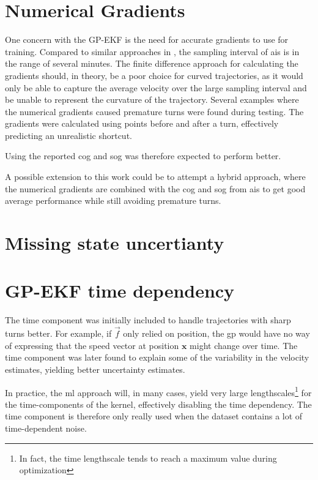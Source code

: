 \section{Numerical Gradients}
One concern with the GP-EKF is the need for accurate gradients to use for training. Compared to similar approaches in \cite{vehicle_gp_prediction,pedestrian}, the sampling interval of \acrshort{ais} is in the range of several minutes. The finite difference approach for calculating the gradients should, in theory, be a poor choice for curved trajectories, as it would only be able to capture the average velocity over the large sampling interval and be unable to represent the curvature of the trajectory. Several examples where the numerical gradients caused premature turns were found during testing. The gradients were calculated using points before and after a turn, effectively predicting an unrealistic shortcut.  

Using the reported \acrshort{cog} and \acrshort{sog} was therefore expected to perform better. 

A possible extension to this work could be to attempt a hybrid approach, where the numerical gradients are combined with the \acrshort{cog} and \acrshort{sog} from \acrshort{ais} to get good average performance while still avoiding premature turns. 

\section{Missing state uncertianty}

\section{GP-EKF time dependency}
The time component was initially included to handle trajectories with sharp turns better. For example, if $\vec{f}$ only relied on position, the \acrshort{gp} would have no way of expressing that the speed vector at position $\boldsymbol{x}$ might change over time. The time component was later found to explain some of the variability in the velocity estimates, yielding better uncertainty estimates.

In practice, the \acrshort{ml} approach will, in many cases, yield very large lengthscales\footnote{In fact, the time lengthscale tends to reach a maximum value during optimization} for the time-components of the kernel, effectively disabling the time dependency. The time component is therefore only really used when the dataset contains a lot of time-dependent noise.


